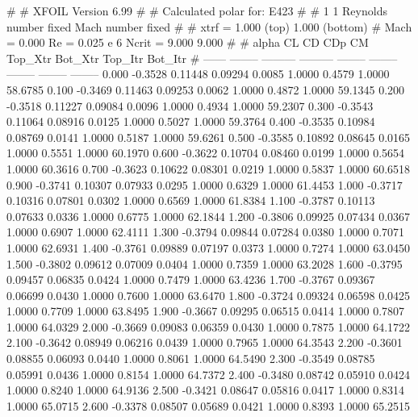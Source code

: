 #  
#       XFOIL         Version 6.99
#  
# Calculated polar for: E423                                            
#  
# 1 1 Reynolds number fixed          Mach number fixed         
#  
# xtrf =   1.000 (top)        1.000 (bottom)  
# Mach =   0.000     Re =     0.025 e 6     Ncrit =   9.000  9.000
#  
#   alpha    CL        CD       CDp       CM     Top_Xtr  Bot_Xtr  Top_Itr  Bot_Itr
#  ------ -------- --------- --------- -------- -------- -------- -------- --------
   0.000  -0.3528   0.11448   0.09294   0.0085   1.0000   0.4579   1.0000  58.6785
   0.100  -0.3469   0.11463   0.09253   0.0062   1.0000   0.4872   1.0000  59.1345
   0.200  -0.3518   0.11227   0.09084   0.0096   1.0000   0.4934   1.0000  59.2307
   0.300  -0.3543   0.11064   0.08916   0.0125   1.0000   0.5027   1.0000  59.3764
   0.400  -0.3535   0.10984   0.08769   0.0141   1.0000   0.5187   1.0000  59.6261
   0.500  -0.3585   0.10892   0.08645   0.0165   1.0000   0.5551   1.0000  60.1970
   0.600  -0.3622   0.10704   0.08460   0.0199   1.0000   0.5654   1.0000  60.3616
   0.700  -0.3623   0.10622   0.08301   0.0219   1.0000   0.5837   1.0000  60.6518
   0.900  -0.3741   0.10307   0.07933   0.0295   1.0000   0.6329   1.0000  61.4453
   1.000  -0.3717   0.10316   0.07801   0.0302   1.0000   0.6569   1.0000  61.8384
   1.100  -0.3787   0.10113   0.07633   0.0336   1.0000   0.6775   1.0000  62.1844
   1.200  -0.3806   0.09925   0.07434   0.0367   1.0000   0.6907   1.0000  62.4111
   1.300  -0.3794   0.09844   0.07284   0.0380   1.0000   0.7071   1.0000  62.6931
   1.400  -0.3761   0.09889   0.07197   0.0373   1.0000   0.7274   1.0000  63.0450
   1.500  -0.3802   0.09612   0.07009   0.0404   1.0000   0.7359   1.0000  63.2028
   1.600  -0.3795   0.09457   0.06835   0.0424   1.0000   0.7479   1.0000  63.4236
   1.700  -0.3767   0.09367   0.06699   0.0430   1.0000   0.7600   1.0000  63.6470
   1.800  -0.3724   0.09324   0.06598   0.0425   1.0000   0.7709   1.0000  63.8495
   1.900  -0.3667   0.09295   0.06515   0.0414   1.0000   0.7807   1.0000  64.0329
   2.000  -0.3669   0.09083   0.06359   0.0430   1.0000   0.7875   1.0000  64.1722
   2.100  -0.3642   0.08949   0.06216   0.0439   1.0000   0.7965   1.0000  64.3543
   2.200  -0.3601   0.08855   0.06093   0.0440   1.0000   0.8061   1.0000  64.5490
   2.300  -0.3549   0.08785   0.05991   0.0436   1.0000   0.8154   1.0000  64.7372
   2.400  -0.3480   0.08742   0.05910   0.0424   1.0000   0.8240   1.0000  64.9136
   2.500  -0.3421   0.08647   0.05816   0.0417   1.0000   0.8314   1.0000  65.0715
   2.600  -0.3378   0.08507   0.05689   0.0421   1.0000   0.8393   1.0000  65.2515
